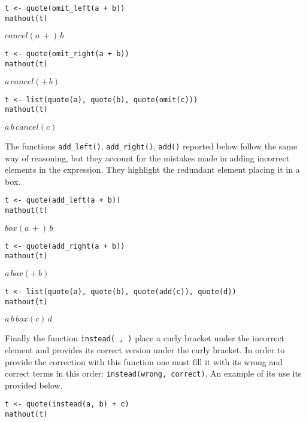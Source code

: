 \begin{verbatim}
t <- quote(omit_left(a + b))
mathout(t)
\end{verbatim}

\({{{cancel}\left({{a}{\,+}}\right)}{\,{b}}}\)

\begin{verbatim}
t <- quote(omit_right(a + b))
mathout(t)
\end{verbatim}

\({{a}{\,{{cancel}\left({+{\,{b}}}\right)}}}\)

\begin{verbatim}
t <- list(quote(a), quote(b), quote(omit(c)))
mathout(t)
\end{verbatim}

\({{a}{\,{b}{\,{{cancel}\left({c}\right)}}}}\)

The functions \texttt{add\_left()}, \texttt{add\_right()}, \texttt{add()} reported below follow the same way of reasoning, but they account for the mistakes made in adding incorrect elements in the expression. They highlight the redundant element placing it in a box.

\begin{verbatim}
t <- quote(add_left(a + b))
mathout(t)
\end{verbatim}

\({{{box}\left({{a}{\,+}}\right)}{\,{b}}}\)

\begin{verbatim}
t <- quote(add_right(a + b))
mathout(t)
\end{verbatim}

\({{a}{\,{{box}\left({+{\,{b}}}\right)}}}\)

\begin{verbatim}
t <- list(quote(a), quote(b), quote(add(c)), quote(d))
mathout(t)
\end{verbatim}

\({{a}{\,{b}{\,{{box}\left({c}\right)}{\,{d}}}}}\)

Finally the function \texttt{instead(\ ,\ )} place a curly bracket under the incorrect element and provides its correct version under the curly bracket. In order to provide the correction with this function one must fill it with its wrong and correct terms in this order: \texttt{instead(wrong,\ correct)}. An example of its use its provided below.

\begin{verbatim}
t <- quote(instead(a, b) + c)
mathout(t)
\end{verbatim}

